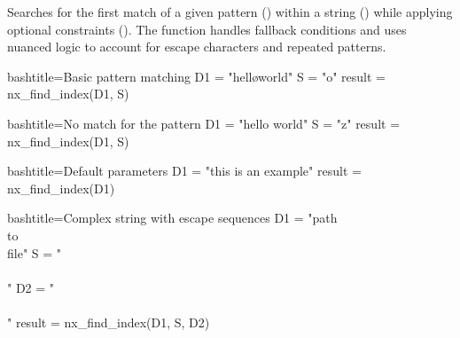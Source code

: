 \begin{NexMainBox}
	\begin{NexMainBox}
		Searches for the first match of a given pattern () within a string () while applying optional constraints (). The function handles fallback conditions and uses nuanced logic to account for escape characters and repeated patterns.
	\end{NexMainBox}
	\begin{NexMainBox}
		\begin{NexListDark}
		\end{NexListDark}
	\end{NexMainBox}
\end{NexMainBox}

\begin{NexCodeBox}{bash}{title={Basic pattern matching}}
	D1 = "hell\o world"
	S = "o"
	result = nx_find_index(D1, S)
\end{NexCodeBox}

\begin{NexCodeBox}{bash}{title={No match for the pattern}}
	D1 = "hello world"
	S = "z"
	result = nx_find_index(D1, S)
\end{NexCodeBox}

\begin{NexCodeBox}{bash}{title={Default parameters}}
	D1 = "this is an example"
	result = nx_find_index(D1)
\end{NexCodeBox}

\begin{NexCodeBox}{bash}{title={Complex string with escape sequences}}
	D1 = "path\\to\\file"
	S = "\\\\"
	D2 = "\\\\"
	result = nx_find_index(D1, S, D2)
\end{NexCodeBox}

